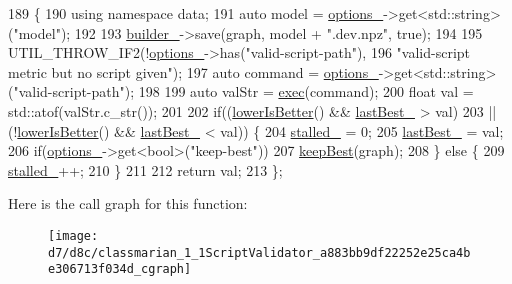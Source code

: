 \begin{DoxyCode}
189                                                      \{
190     \textcolor{keyword}{using namespace }data;
191     \textcolor{keyword}{auto} model = \hyperlink{classmarian_1_1Validator_a59fc30678618608874029374e386d3c0}{options\_}->get<std::string>(\textcolor{stringliteral}{"model"});
192 
193     \hyperlink{classmarian_1_1ScriptValidator_ad9e9bb1342f82248d0d89f3400d0a259}{builder\_}->save(graph, model + \textcolor{stringliteral}{".dev.npz"}, \textcolor{keyword}{true});
194 
195     UTIL\_THROW\_IF2(!\hyperlink{classmarian_1_1Validator_a59fc30678618608874029374e386d3c0}{options\_}->has(\textcolor{stringliteral}{"valid-script-path"}),
196                    \textcolor{stringliteral}{"valid-script metric but no script given"});
197     \textcolor{keyword}{auto} command = \hyperlink{classmarian_1_1Validator_a59fc30678618608874029374e386d3c0}{options\_}->get<std::string>(\textcolor{stringliteral}{"valid-script-path"});
198 
199     \textcolor{keyword}{auto} valStr = \hyperlink{classmarian_1_1ScriptValidator_a19d938c1fd18d2cb71cec81ccd473fca}{exec}(command);
200     \textcolor{keywordtype}{float} val = std::atof(valStr.c\_str());
201 
202     \textcolor{keywordflow}{if}((\hyperlink{classmarian_1_1ScriptValidator_aef28332c0e50f4d123f7851af2568eee}{lowerIsBetter}() && \hyperlink{classmarian_1_1Validator_a6fbe055b2a8c2341172091b2bbde0a59}{lastBest\_} > val)
203        || (!\hyperlink{classmarian_1_1ScriptValidator_aef28332c0e50f4d123f7851af2568eee}{lowerIsBetter}() && \hyperlink{classmarian_1_1Validator_a6fbe055b2a8c2341172091b2bbde0a59}{lastBest\_} < val)) \{
204       \hyperlink{classmarian_1_1Validator_a9fe2c3f4b9b5f38d1a2db2a9ba8704e8}{stalled\_} = 0;
205       \hyperlink{classmarian_1_1Validator_a6fbe055b2a8c2341172091b2bbde0a59}{lastBest\_} = val;
206       \textcolor{keywordflow}{if}(\hyperlink{classmarian_1_1Validator_a59fc30678618608874029374e386d3c0}{options\_}->get<\textcolor{keywordtype}{bool}>(\textcolor{stringliteral}{"keep-best"}))
207         \hyperlink{classmarian_1_1ScriptValidator_a3c0cbf95838821af29430eb5d8de3d5a}{keepBest}(graph);
208     \} \textcolor{keywordflow}{else} \{
209       \hyperlink{classmarian_1_1Validator_a9fe2c3f4b9b5f38d1a2db2a9ba8704e8}{stalled\_}++;
210     \}
211 
212     \textcolor{keywordflow}{return} val;
213   \};
\end{DoxyCode}


Here is the call graph for this function\+:
\nopagebreak
\begin{figure}[H]
\begin{center}
\leavevmode
\texttt{[image: d7/d8c/classmarian\_1\_1ScriptValidator\_a883bb9df22252e25ca4be306713f034d\_cgraph]}
\end{center}
\end{figure}


